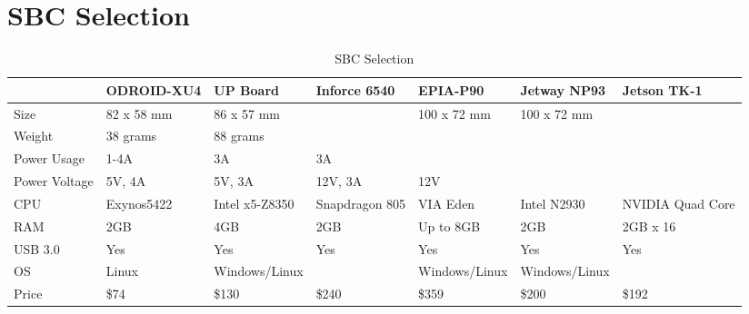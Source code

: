 \section{SBC Selection}
\begin{landscape}
    \begin{table}[h!]
    \caption{SBC Selection}
    \label{table:sbc_selection}
    \centering
    \begin{tabular}{|l|l|l|l|l|l|l|}
        \hline              & ODROID-XU4 & UP Board       & Inforce 6540   & EPIA-P90       & Jetway NP93   & Jetson TK-1      \\ \hline
        Size                & 82 x 58 mm & 86 x 57 mm     &                & 100 x 72 mm    & 100 x 72 mm   &                  \\
        Weight              & 38 grams   & 88 grams       &                &                &               &                  \\
        Power Usage         & 1-4A       & 3A             & 3A             &                &               &                  \\
        Power Voltage       & 5V, 4A     & 5V, 3A         & 12V, 3A        & 12V            &               &                  \\
        CPU                 & Exynos5422 & Intel x5-Z8350 & Snapdragon 805 & VIA Eden       & Intel N2930   & NVIDIA Quad Core \\
        RAM                 & 2GB        & 4GB            & 2GB            & Up to 8GB      & 2GB           & 2GB x 16         \\
        USB 3.0             & Yes        & Yes            & Yes            & Yes            & Yes           & Yes              \\
        OS                  & Linux      & Windows/Linux  &                & Windows/Linux  & Windows/Linux &                  \\
        Price               & \$74       & \$130          & \$240          & \$359          & \$200         & \$192            \\ \hline
    \end{tabular}
    \end{table}
\end{landscape} \par
